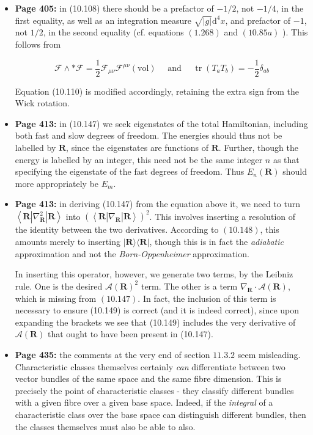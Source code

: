 \documentclass{article}
\begin{document}
\begin{itemize}
\item[] {\bf  Page 405:} in (10.108) there should be a prefactor of $-1 / 2$, not $-1 / 4$, in the first equality, as well as an integration measure $\sqrt{|g|} \mathrm{d}^{4} x$, and prefactor of $-1$, not $1 / 2$, in the second equality (cf. equations $(1.268)$ and $(10.85 a)$ ). This follows from

$$
\mathcal{F} \wedge * \mathcal{F}=\frac{1}{2} \mathcal{F}_{\mu \nu} \mathcal{F}^{\mu \nu}(\mathrm{vol}) \quad \text { and } \quad \operatorname{tr}\left(T_{a} T_{b}\right)=-\frac{1}{2} \delta_{a b}
$$

Equation (10.110) is modified accordingly, retaining the extra sign from the Wick rotation.

\item[] {\bf  Page 413:} in (10.147) we seek eigenstates of the total Hamiltonian, including both fast and slow degrees of freedom. The energies should thus not be labelled by $\mathbf{R}$, since the eigenstates are functions of $\mathbf{R}$. Further, though the energy is labelled by an integer, this need not be the same integer $n$ as that specifying the eigenstate of the fast degrees of freedom. Thus $E_{n}(\mathbf{R})$ should more appropriately be $E_{m}$.

\item[] {\bf  Page 413:} in deriving (10.147) from the equation above it, we need to turn $\left\langle\mathbf{R}\left|\nabla_{\mathbf{R}}^{2}\right| \mathbf{R}\right\rangle$ into $\left(\left\langle\mathbf{R}\left|\nabla_{\mathbf{R}}\right| \mathbf{R}\right\rangle\right)^{2}$. This involves inserting a resolution of the identity between the two derivatives. According to $(10.148)$, this amounts merely to inserting $|\mathbf{R}\rangle\langle\mathbf{R}|$, though this is in fact the \emph{adiabatic} approximation and not the \emph{Born-Oppenheimer} approximation.

In inserting this operator, however, we generate two terms, by the Leibniz rule. One is the desired $\mathcal{A}(\mathbf{R})^{2}$ term. The other is a term $\nabla_{\mathbf{R}} \cdot \mathcal{A}(\mathbf{R})$, which is missing from $(10.147)$. In fact, the inclusion of this term is necessary to ensure (10.149) is correct (and it is indeed correct), since upon expanding the brackets we see that (10.149) includes the very derivative of $\mathcal{A}(\mathbf{R})$ that ought to have been present in (10.147).

\item[] {\bf  Page 435:} the comments at the very end of section $11.3 .2$ seem misleading. Characteristic classes themselves certainly \emph{can} differentiate between two vector bundles of the same space and the same fibre dimension. This is precisely the point of characteristic classes - they classify different bundles with a given fibre over a given base space. Indeed, if the \emph{integral} of a characteristic class over the base space can distinguish different bundles, then the classes themselves must also be able to also.


\end{itemize}
\end{document}
